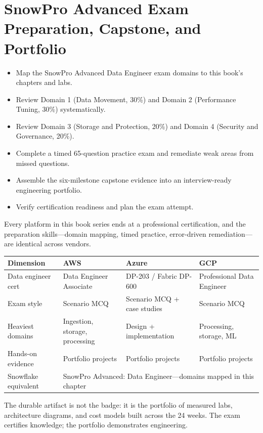 \chapter{SnowPro Advanced Exam Preparation, Capstone, and Portfolio}
%
\begin{objectives}
\begin{itemize}
    \item Map the SnowPro Advanced Data Engineer exam domains to this book's chapters and labs.
    \item Review Domain 1 (Data Movement, 30\%) and Domain 2 (Performance Tuning, 30\%) systematically.
    \item Review Domain 3 (Storage and Protection, 20\%) and Domain 4 (Security and Governance, 20\%).
    \item Complete a timed 65-question practice exam and remediate weak areas from missed questions.
    \item Assemble the six-milestone capstone evidence into an interview-ready engineering portfolio.
    \item Verify certification readiness and plan the exam attempt.
\end{itemize}
\end{objectives}

\begin{crosscloud}
Every platform in this book series ends at a professional certification, and the preparation skills---domain mapping, timed practice, error-driven remediation---are identical across vendors.

\vspace{2mm}
{\footnotesize
\begin{tabular}{@{}p{2.8cm}p{3.0cm}p{3.0cm}p{3.0cm}@{}}
\toprule
\textbf{Dimension} & \textbf{AWS} & \textbf{Azure} & \textbf{GCP} \\
\midrule
Data engineer cert & Data Engineer Associate & DP-203 / Fabric DP-600 & Professional Data Engineer \\
Exam style & Scenario MCQ & Scenario MCQ + case studies & Scenario MCQ \\
Heaviest domains & Ingestion, storage, processing & Design + implementation & Processing, storage, ML \\
Hands-on evidence & Portfolio projects & Portfolio projects & Portfolio projects \\
\addlinespace
Snowflake equivalent & \multicolumn{3}{l}{SnowPro Advanced: Data Engineer---domains mapped in this chapter} \\
\bottomrule
\end{tabular}}

\vspace{1mm}
The durable artifact is not the badge: it is the portfolio of measured labs, architecture diagrams, and cost models built across the 24 weeks. The exam certifies knowledge; the portfolio demonstrates engineering.
\end{crosscloud}

